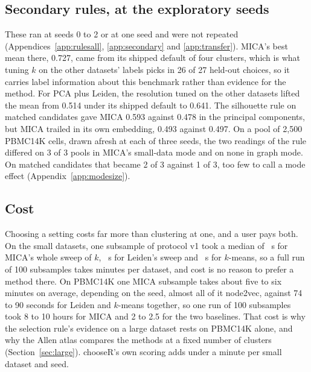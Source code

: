 \subsection{Secondary rules, at the exploratory seeds}\label{sec:transfer}
These ran at seeds 0 to 2 or at one seed and were not repeated (Appendices~\ref{app:rulesall},
\ref{app:secondary} and \ref{app:transfer}). MICA's best mean there, 0.727, came from its
shipped default of four clusters, which is what tuning $k$ on the other datasets' labels picks in 26 of 27
held-out choices, so it carries label information about this benchmark rather than evidence for the method.
For PCA plus Leiden, the resolution tuned on the other datasets lifted the mean from 0.514 under its shipped default to 0.641. The silhouette rule on matched
candidates gave MICA 0.593 against 0.478 in the principal components, but MICA trailed in its own embedding,
0.493 against 0.497. On a pool of 2,500 PBMC14K cells, drawn afresh at each of three seeds, the two readings of the rule
differed on 3 of 3 pools in MICA's small-data mode and on none in graph mode. On matched candidates that
became 2 of 3 against 1 of 3, too few to call a mode effect (Appendix~\ref{app:modesize}).

\subsection{Cost}\label{sec:cost}
Choosing a setting costs far more than clustering at one, and a user pays both. On the small datasets, one
subsample of protocol v1 took a median of ~s for MICA's whole sweep of $k$,
~s for Leiden's sweep and ~s for $k$-means, so a
full run of 100 subsamples takes minutes per dataset, and cost is no reason to prefer a method there. On
PBMC14K one MICA subsample takes about five to six minutes on average, depending on the seed, almost all
of it node2vec, against 74 to 90 seconds for Leiden and $k$-means together, so one run of 100 subsamples took 8 to 10 hours for MICA and 2 to 2.5 for the two baselines. That cost is why the selection rule's evidence on a large dataset rests on PBMC14K alone, and why the
Allen atlas compares the methods at a fixed number of clusters (Section~\ref{sec:large}). chooseR's own scoring adds under a minute per
small dataset and seed.

